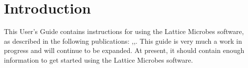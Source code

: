 \chapter{Introduction}

This User's Guide contains instructions for using the Lattice Microbes software, as described in the following publications: \cite{Roberts2009lts},\cite{Roberts2011nci},\cite{Roberts2012slm}. This guide is very much a work in progress and will continue to be expanded. At present, it should contain enough information to get started using the Lattice Microbes software.

